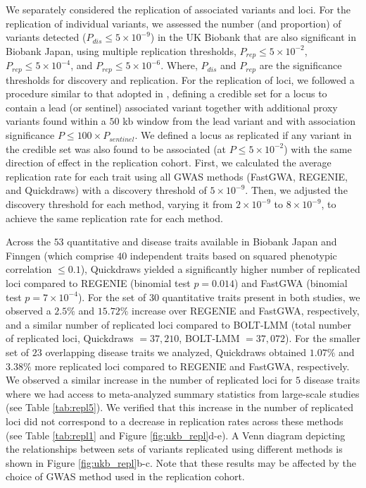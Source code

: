 %
We separately considered the replication of associated variants and loci.
%
For the replication of individual variants, we assessed the number (and proportion) of variants detected ($P_{dis} \leq 5 \times 10^{-9}$) in the UK Biobank that are also significant in Biobank Japan, using multiple replication thresholds, $P_{rep} \leq 5 \times 10^{-2}$, $P_{rep} \leq 5 \times 10^{-4}$, and $P_{rep} \leq 5 \times 10^{-6}$.
%
Where, $P_{dis}$ and $P_{rep}$ are the significance thresholds for discovery and replication.
%
For the replication of loci, we followed a procedure similar to that adopted in \cite{huang2022transferability}, defining a credible set for a locus to contain a lead (or sentinel) associated variant together with additional proxy variants found within a $50$ kb window from the lead variant and with association significance $P \leq 100 \times P_{sentinel}$.
%
We defined a locus as replicated if any variant in the credible set was also found to be associated (at $P \leq 5 \times 10^{-2}$) with the same direction of effect in the replication cohort.
%
First, we calculated the average replication rate for each trait using all GWAS methods (FastGWA, REGENIE, and Quickdraws) with a discovery threshold of $5 \times 10^{-9}$.
%
Then, we adjusted the discovery threshold for each method, varying it from $2 \times 10^{-9}$ to $8 \times 10^{-9}$, to achieve the same replication rate for each method.


Across the $53$ quantitative and disease traits available in Biobank Japan and Finngen (which comprise $40$ independent traits based on squared phenotypic correlation $\leq 0.1$), Quickdraws yielded a significantly higher number of replicated loci compared to REGENIE (binomial test $p=0.014$) and FastGWA (binomial test $p=7 \times 10^{-4}$).
%
For the set of $30$ quantitative traits present in both studies, we observed a $2.5\%$ and $15.72\%$ increase over REGENIE and FastGWA, respectively, and a similar number of replicated loci compared to BOLT-LMM (total number of replicated loci, Quickdraws $=37{,}210$, BOLT-LMM $=37{,}072$).
%
For the smaller set of $23$ overlapping disease traits we analyzed, Quickdraws obtained $1.07\%$ and $3.38\%$ more replicated loci compared to REGENIE and FastGWA, respectively.
%
We observed a similar increase in the number of replicated loci for $5$ disease traits where we had access to meta-analyzed summary statistics from large-scale studies (see Table \ref{tab:repl5}).
%
We verified that this increase in the number of replicated loci did not correspond to a decrease in replication rates across these methods (see Table \ref{tab:repl1} and Figure \ref{fig:ukb_repl}d-e).
%
A Venn diagram depicting the relationships between sets of variants replicated using different methods is shown in Figure \ref{fig:ukb_repl}b-c.
%
Note that these results may be affected by the choice of GWAS method used in the replication cohort.

